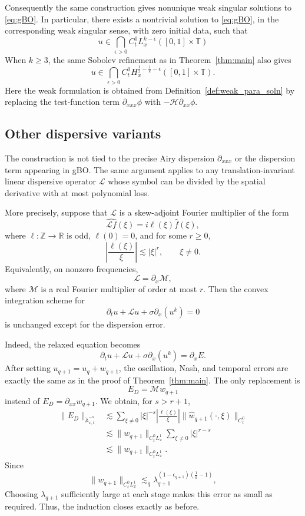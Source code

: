 \documentclass[12pt,reqno,letterpaper]{amsart}
\numberwithin{equation}{section}
\newcommand{\1}{{\bf 1}}
\newcommand{\2}{{\bf 2}}
\newcommand{\T}{\mathbb T}
\theoremstyle{remark}
\theoremstyle{remark}
\begin{document}
Consequently the same construction gives nonunique weak singular solutions to \eqref{eq:gBO}.  In particular, there exists a nontrivial solution to \eqref{eq:gBO}, in the corresponding weak singular sense, with zero initial data, such that
\[
    u\in \bigcap_{\epsilon > 0} C_t^0L_x^{k-\epsilon}([0,1]\times\T)
\]
When $k\geq3$, the same Sobolev refinement as in Theorem~\ref{thm:main}
also gives
\[
    u\in \bigcap_{\epsilon > 0} C_t^0H_x^{\frac{1}{2}-\frac{1}{k} - \epsilon}([0,1]\times\T).
\]
Here the weak formulation is obtained from
Definition~\ref{def:weak_para_soln} by replacing the test-function term
$\partial_{xxx}\phi$ with $-\mathcal H\partial_{xx}\phi$.

\subsection{Other dispersive variants}\label{sec:other-dispersive-variants}
The construction is not tied to the precise Airy dispersion
$\partial_{xxx}$ or the dispersion term appearing in \textsf{gBO}. The same argument applies to any translation-invariant
linear dispersive operator $\mathcal L$ whose symbol can be divided by the
spatial derivative with at most polynomial loss.

More precisely, suppose that $\mathcal L$ is a skew-adjoint Fourier
multiplier of the form
\[
    \widehat{\mathcal L f}(\xi)=i\ell(\xi)\hat f(\xi),
\]
where $\ell:\mathbb Z\to\mathbb R$ is odd, $\ell(0)=0$, and for some
$r\ge0$,
\[
    \left|\frac{\ell(\xi)}{\xi}\right|
    \lesssim
    |\xi|^r,
    \qquad \xi\neq0.
\]
Equivalently, on nonzero frequencies,
\[
    \mathcal L=\partial_x\mathcal M,
\]
where $\mathcal M$ is a real Fourier multiplier of order at most $r$. Then the convex integration scheme for
\[
    \partial_tu+\mathcal L u+\sigma\partial_x(u^k)=0
\]
is unchanged except for the dispersion error.

Indeed, the relaxed equation becomes
\[
    \partial_tu+\mathcal L u+\sigma\partial_x(u^k)=\partial_xE.
\]
After setting $u_{q+1}=u_q+w_{q+1}$, the oscillation, Nash, and temporal
errors are exactly the same as in the proof of Theorem~\ref{thm:main}.  The only
replacement is
\[
    E_D=\mathcal M w_{q+1}
\]
instead of $E_D=\partial_{xx}w_{q+1}$. We obtain, for $s>r+1$,
\[
\begin{aligned}
    \|E_D\|_{\dot{\mathbb{A}}_{x,t}^{-s}}
    &\lesssim
    \sum_{\xi\neq0}
    |\xi|^{-s}
    \left|\frac{\ell(\xi)}{\xi}\right|
    \|\hat{w}_{q+1}(\cdot,\xi)\|_{C_t^0} \\
    &\lesssim
    \|w_{q+1}\|_{C_t^0L_x^1}
    \sum_{\xi \not=0}
    |\xi|^{r-s}  \\
    &\lesssim
    \|w_{q+1}\|_{C_t^0L_x^1}.
\end{aligned}
\]
Since
\[
    \|w_{q+1}\|_{C_t^0L_x^1}
    \lesssim_q
    \lambda_{q+1}^{(1-\epsilon_{q+1})(\frac1k-1)},
\]
Choosing $\lambda_{q+1}$ sufficiently large at each stage makes this error as small as required. Thus, the induction closes exactly as before.
\end{document}
